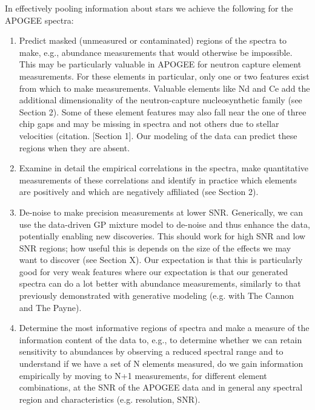 \documentclass[a4paper,fleqn,usenatbib]{mnras}
\begin{document}
In effectively pooling information about stars we achieve the following for the APOGEE spectra: \\
\begin{enumerate}
\item Predict masked (unmeasured or contaminated) regions of the spectra to make, e.g., abundance measurements that would otherwise be impossible. This may be particularly valuable in APOGEE for neutron capture element measurements. For these elements in particular,  only one or two features exist from which to make measurements. Valuable elements like Nd and Ce add the additional dimensionality of the neutron-capture nucleosynthetic family (see Section 2). Some of these element features may also fall near the one of three chip gaps and may be missing in spectra and not others due to stellar velocities (citation. [Section 1]. Our modeling of the data can predict these regions when they are absent. 
\item Examine in detail the empirical correlations in the spectra, make quantitative measurements of these correlations and identify in practice which elements are positively and which are negatively affiliated (see Section 2). %
\item De-noise to make precision measurements at lower SNR.  Generically, we can use the data-driven GP mixture model to de-noise and thus enhance the data, potentially enabling new discoveries. This should work for high SNR and low SNR regions; how useful this is depends on the size of the effects we may want to discover (see Section X). Our expectation is that this is particularly good for very weak features where our expectation is that our generated spectra can do a lot better with abundance measurements, similarly to that previously demonstrated with generative modeling (e.g. with The Cannon and The Payne).
\item Determine the most informative regions of spectra and make a measure of the information content of the data to, e.g., to determine whether we can retain sensitivity to abundances by observing a reduced spectral range and to understand if we have a set of N elements measured, do we gain information empirically by moving to N+1 measurements, for different element combinations, at the SNR of the APOGEE data and in general any spectral region and characteristics (e.g. resolution, SNR). 
\end{enumerate}
\end{document}
